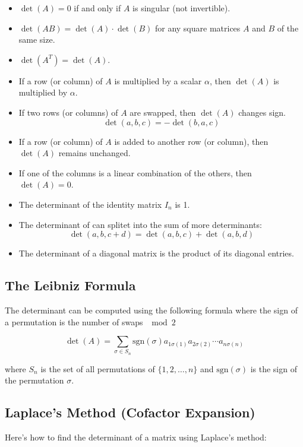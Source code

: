 \begin{itemize}[label=\(-\)]
    \item \(\det(A) = 0\) if and only if \(A\) is singular (not invertible).
    \item \(\det(AB) = \det(A) \cdot \det(B)\) for any square matrices \(A\) and \(B\) of the same size.
    \item \(\det(A^T) = \det(A)\).
    \item If a row (or column) of \(A\) is multiplied by a scalar \(\alpha\), then \(\det(A)\) is multiplied by \(\alpha\).
    \item If two rows (or columns) of \(A\) are swapped, then \(\det(A)\) changes sign.
    \[\det(a,b,c) = - \det(b,a,c)\]
    \item If a row (or column) of \(A\) is added to another row (or column), then \(\det(A)\) remains unchanged.
    \item If one of the columns is a linear combination of the others, then \(\det(A) = 0\).
    \item The determinant of the identity matrix \(I_n\) is 1.
    \item The determinant of can splitet into the sum of more determinants:
    \[
    \det(a,b,c + d) = \det(a,b,c) + \det(a,b,d)
    \]
    \item The determinant of a diagonal matrix is the product of its diagonal entries.
\end{itemize}

\subsection{The Leibniz Formula}

The determinant can be computed using the following formula where the sign
of a permutation is the number of swaps \(\mod 2\)

\[
\det(A) = \sum_{\sigma \in S_n} \text{sgn}(\sigma) a_{1\sigma(1)} a_{2\sigma(2)} \cdots a_{n\sigma(n)}
\]
    
where \(S_n\) is the set of all permutations of \(\{1, 2, \dots, n\}\) and \(\text{sgn}(\sigma)\) is the sign of the permutation \(\sigma\). 

\subsection{Laplace's Method (Cofactor Expansion)}

Here's how to find the determinant of a matrix using Laplace's method:

